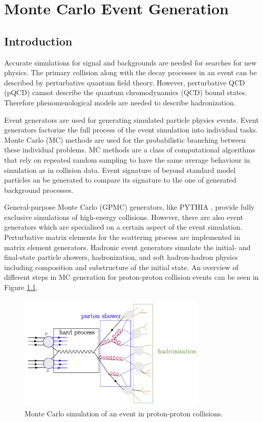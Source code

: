 %
%

\chapter{Monte Carlo Event Generation}
\label{chap:event_sim}

\section{Introduction}

Accurate simulations for signal and backgrounds are needed for searches for new physics. The primary collision along with the decay processes in an event can be described by perturbative quantum field theory. However, perturbative QCD (pQCD) cannot describe the quantum chromodynamics (QCD) bound states. Therefore phenomenological models are needed to describe hadronization.

Event generators are used for generating simulated particle physics events. Event generators factorize the full process of the event simulation into individual tasks. Monte Carlo (MC) methods are used for the probabilistic branching between these individual problems. MC methods are a class of computational algorithms that rely on repeated random sampling to have the same average behaviour in simulation as in collision data. Event signature of beyond standard model particles an be generated to compare its signature to the one of generated background processes.

General-purpose Monte Carlo (GPMC) generators, like PYTHIA \cite{Sjostrand:2014zea}, provide fully exclusive simulations of high-energy collisions. However, there are also event generators which are specialised on a certain aspect of the event simulation. Perturbative matrix elements for the scattering process are implemented in matrix element generators. Hadronic event generators simulate the initial- and final-state particle showers, hadronization, and soft hadron-hadron physics including composition and substructure of the initial state. An overview of different steps in MC generation for proton-proton collision events can be seen in Figure \ref{fig:simulation}.

\begin{figure}[htbp]
  \centering
  \includegraphics[width=0.8\textwidth]{plots/chapter4/simulation.png}
  \caption{Monte Carlo simulation of an event in proton-proton collisions.}
  \label{fig:simulation}
\end{figure}

